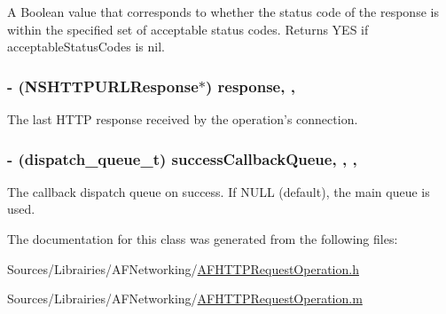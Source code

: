 A Boolean value that corresponds to whether the status code of the response is within the specified set of acceptable status codes. Returns {\ttfamily Y\-E\-S} if {\ttfamily acceptable\-Status\-Codes} is {\ttfamily nil}. \hypertarget{interface_a_f_h_t_t_p_request_operation_a7a6e0248cffbdfa767d79e864fc1e730}{
\subsubsection[{response}]{\setlength{\rightskip}{0pt plus 5cm}-\/ (N\-S\-H\-T\-T\-P\-U\-R\-L\-Response$\ast$) response\hspace{0.3cm}{\ttfamily [read]}, {\ttfamily [nonatomic]}, {\ttfamily [strong]}}}\label{interface_a_f_h_t_t_p_request_operation_a7a6e0248cffbdfa767d79e864fc1e730}
The last H\-T\-T\-P response received by the operation's connection. \hypertarget{interface_a_f_h_t_t_p_request_operation_a54c7b52a48c9347ebe1782efd35a7709}{
\subsubsection[{success\-Callback\-Queue}]{\setlength{\rightskip}{0pt plus 5cm}-\/ (dispatch\-\_\-queue\-\_\-t) success\-Callback\-Queue\hspace{0.3cm}{\ttfamily [read]}, {\ttfamily [write]}, {\ttfamily [nonatomic]}, {\ttfamily [assign]}}}\label{interface_a_f_h_t_t_p_request_operation_a54c7b52a48c9347ebe1782efd35a7709}
The callback dispatch queue on success. If {\ttfamily N\-U\-L\-L} (default), the main queue is used. 

The documentation for this class was generated from the following files\-:\begin{DoxyCompactItemize}
\item 
Sources/\-Librairies/\-A\-F\-Networking/\hyperlink{_a_f_h_t_t_p_request_operation_8h}{A\-F\-H\-T\-T\-P\-Request\-Operation.\-h}\item 
Sources/\-Librairies/\-A\-F\-Networking/\hyperlink{_a_f_h_t_t_p_request_operation_8m}{A\-F\-H\-T\-T\-P\-Request\-Operation.\-m}\end{DoxyCompactItemize}
